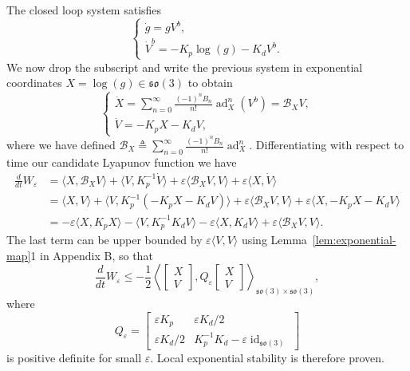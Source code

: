 \documentclass[11pt]{article}
\newcommand{\so}{\mathfrak{so}}
\newcommand{\ad}{\operatorname{ad}}
\newcommand{\id}{\operatorname{id}}
\newcommand{\calB}{\mathcal B}
\newcommand{\eps}{\varepsilon}
\begin{document}
The closed loop system satisfies
\begin{equation*}
\begin{cases}
\dot g=gV^b,\\
\dot V^b=-K_p\log(g)-K_dV^b.
\end{cases}
\end{equation*}
We now drop the subscript and write the previous system in exponential coordinates $X=\log(g)\in\so(3)$ to obtain
\begin{equation*}
\begin{cases}
\displaystyle \dot X=\sum_{n=0}^{\infty}\frac{(-1)^nB_n}{n!}\ad_X^n(V^b)=\calB_XV,\\[4pt]
\dot V=-K_pX-K_dV,
\end{cases}
\end{equation*}
where we have defined $\calB_X\triangleq\sum_{n=0}^{\infty}\frac{(-1)^nB_n}{n!}\ad_X^n$. Differentiating with respect to time our candidate Lyapunov function we have
\begin{align*}
\frac{d}{dt}W_\eps
&=\langle X,\calB_XV\rangle+\langle V,K_p^{-1}\dot V\rangle
+\eps\langle\calB_XV,V\rangle+\eps\langle X,\dot V\rangle\\
&=\langle X,V\rangle+\langle V,K_p^{-1}(-K_pX-K_dV)\rangle
+\eps\langle\calB_XV,V\rangle+\eps\langle X,-K_pX-K_dV\rangle\\
&=-\eps\langle X,K_pX\rangle-\langle V,K_p^{-1}K_dV\rangle-\eps\langle X,K_dV\rangle
+\eps\langle\calB_XV,V\rangle.
\end{align*}
The last term can be upper bounded by $\eps\langle V,V\rangle$ using Lemma~\ref{lem:exponential-map}1 in Appendix B, so that
\begin{equation*}
\frac{d}{dt}W_\eps\le -\frac12\left\langle\begin{bmatrix}X\\V\end{bmatrix},Q_\eps\begin{bmatrix}X\\V\end{bmatrix}\right\rangle_{\so(3)\times\so(3)},
\end{equation*}
where
\begin{equation*}
Q_\eps=\begin{bmatrix}\eps K_p&\eps K_d/2\\\eps K_d/2&K_p^{-1}K_d-\eps\id_{\so(3)}\end{bmatrix}
\end{equation*}
is positive definite for small $\eps$. Local exponential stability is therefore proven.
\end{document}
